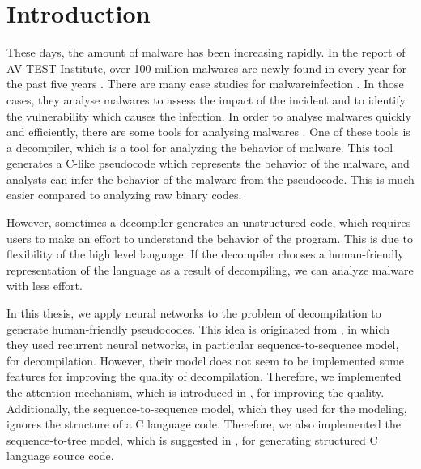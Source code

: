 \documentclass[11pt]{jarticle}
\begin{document}
\tableofcontents

\chapter{Introduction}

These days, the amount of malware has been increasing rapidly. In the report of AV-TEST Institute,
over 100 million malwares are newly found in every year for the past five years \citep{malware_increase}.
There are many case studies for malwareinfection \citep{malware_case_1,malware_case_2,malware_case_3,malware_case_4}.
In those cases, they analyse malwares to assess the impact of the incident and to identify the vulnerability which causes the infection.
In order to analyse malwares quickly and efficiently, there are some tools for analysing malwares \citep{mal_anal_tool}.
One of these tools is a decompiler, which is a tool for analyzing the behavior of malware. 
This tool generates a C-like pseudocode which represents the behavior of the malware, and analysts can infer the behavior of the malware from the pseudocode.
This is much easier compared to analyzing raw binary codes.

However, sometimes a decompiler generates an unstructured code, which requires users to make an effort to understand the behavior of the program. 
This is due to flexibility of the high level language. If the decompiler chooses a human-friendly representation of the language as a result of decompiling, we can analyze malware with less effort. 

In this thesis, we apply neural networks to the problem of decompilation to generate human-friendly pseudocodes. 
This idea is originated from \citet{Motoneta}, in which they used recurrent neural networks, in particular sequence-to-sequence model, for decompilation.
However, their model does not seem to be implemented some features for improving the quality of decompilation.
Therefore, we implemented the attention mechanism, which is introduced in \citet{dot_attention}, for improving the quality.
Additionally, the sequence-to-sequence model, which they used for the modeling, ignores the structure of a C language code.
Therefore, we also implemented the sequence-to-tree model, which is suggested in \citet{Seq2Tree}, for generating structured C language source code.
\end{document}
